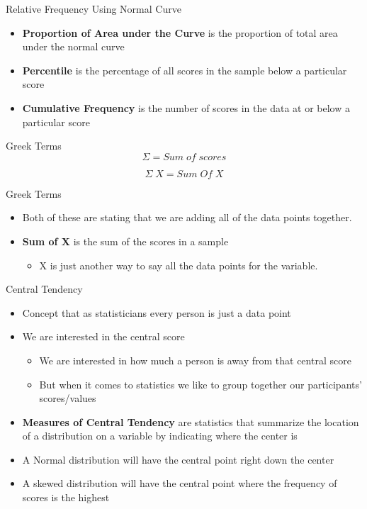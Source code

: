 \documentclass[
  ignorenonframetext,
]{beamer}
\providecommand{\tightlist}{%
  \setlength{\itemsep}{0pt}\setlength{\parskip}{0pt}}\usepackage{longtable,booktabs,array}
\begin{document}
\begin{frame}{Relative Frequency Using Normal Curve}
\label{relative-frequency-using-normal-curve}
\begin{itemize}
\item
  \textbf{Proportion of Area under the Curve} is the proportion of total
  area under the normal curve
\item
  \textbf{Percentile} is the percentage of all scores in the sample
  below a particular score
\item
  \textbf{Cumulative Frequency} is the number of scores in the data at
  or below a particular score
\end{itemize}
\end{frame}

\begin{frame}{Greek Terms}
\label{greek-terms}
\[\Sigma = Sum\;of\;scores\]

\[\Sigma\;X = Sum\;Of\;X\]
\end{frame}

\begin{frame}{Greek Terms}
\label{greek-terms-1}
\begin{itemize}
\item
  Both of these are stating that we are adding all of the data points
  together.
\item
  \textbf{Sum of X} is the sum of the scores in a sample

  \begin{itemize}
  \tightlist
  \item
    X is just another way to say all the data points for the variable.
  \end{itemize}
\end{itemize}
\end{frame}

\begin{frame}{Central Tendency}
\label{central-tendency}
\begin{itemize}
\item
  Concept that as statisticians every person is just a data point
\item
  We are interested in the central score

  \begin{itemize}
  \tightlist
  \item
    We are interested in how much a person is away from that central
    score
  \item
    But when it comes to statistics we like to group together our
    participants' scores/values
  \end{itemize}
\item
  \textbf{Measures of Central Tendency} are statistics that summarize
  the location of a distribution on a variable by indicating where the
  center is
\item
  A Normal distribution will have the central point right down the
  center
\item
  A skewed distribution will have the central point where the frequency
  of scores is the highest
\end{itemize}
\end{frame}
\end{document}
